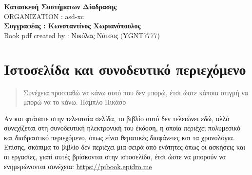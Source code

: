 \documentclass[
]{article}
\begin{document}
\textbf{Κατασκευή Συστήματων Δίαδρασης}\\
ORGANIZATION : asd-xc\\
\textbf{Συγγραφέας : Κωνσταντίνος Χωριανόπουλος}\\
Book pdf created by : Νικόλας Νάτσος (YGNT7777)

\hypertarget{ux3b9ux3c3ux3c4ux3bfux3c3ux3b5ux3bbux3afux3b4ux3b1-ux3baux3b1ux3b9-ux3c3ux3c5ux3bdux3bfux3b4ux3b5ux3c5ux3c4ux3b9ux3baux3cc-ux3c0ux3b5ux3c1ux3b9ux3b5ux3c7ux3ccux3bcux3b5ux3bdux3bf}{%
\section{Ιστοσελίδα και συνοδευτικό
περιεχόμενο}\label{ux3b9ux3c3ux3c4ux3bfux3c3ux3b5ux3bbux3afux3b4ux3b1-ux3baux3b1ux3b9-ux3c3ux3c5ux3bdux3bfux3b4ux3b5ux3c5ux3c4ux3b9ux3baux3cc-ux3c0ux3b5ux3c1ux3b9ux3b5ux3c7ux3ccux3bcux3b5ux3bdux3bf}}

\begin{quote}
Συνέχεια προσπαθώ να κάνω αυτό που δεν μπορώ, έτσι ώστε κάποια στιγμή να
μπορώ να το κάνω. Πάμπλο Πικάσο
\end{quote}

Αν και φτάσατε στην τελευταία σελίδα, το βιβλίο αυτό δεν τελειώνει εδώ,
αλλά συνεχίζεται στη συνοδευτική ηλεκτρονική του έκδοση, η οποία
περιέχει πολυμεσικό και διαδραστικό περιεχόμενο, όπως είναι θεματικές
διαφάνειες και τα χρονολόγια. Επίσης, σκόπιμα το βιβλίο δεν περιέχει μια
σειρά από ενότητες όπως οι ασκήσεις και οι εργασίες, γιατί αυτές
βρίσκονται στην ιστοσελίδα, έτσι ώστε να μπορούν να ενημερώνονται
συνέχεια: \url{https://pibook.epidro.me}
\end{document}
